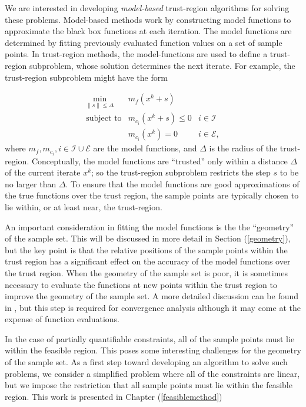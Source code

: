 \documentclass{article}
\newcommand{\norm}[1]{\| #1 \|}
\newcommand{\union}{\cup}
\let\oldref\ref
\renewcommand{\ref}[1]{(\oldref{#1})}
\begin{document}
We are interested in developing {\em model-based} trust-region algorithms for solving these problems.
Model-based methods work by constructing model functions to approximate the black box functions at each iteration.
The model functions are determined by fitting previously evaluated function values on a set of sample points.
In trust-region methods, the model-functions are used to define a trust-region subproblem, whose solution determines the next iterate.
For example, the trust-region subproblem might have the form

\[ \begin{array}{ccl} \min_{\norm{s} \le \Delta}
 & m_{f}(x^k+s) \\
\mbox{subject to} & m_{c_i}(x^k+s) \le 0 & i \in \mathcal{I} \\
& m_{c_i}(x^k) = 0 & i \in \mathcal{E},
\end{array}
\]
where $m_{f}, m_{c_i}, i \in \mathcal{I} \union \mathcal{E}$ are the model functions, and $\Delta$ is the radius of the trust-region.
Conceptually, the model functions are ``trusted'' only within a distance $\Delta$ of the current iterate $x^k$; so the trust-region subproblem restricts the step $s$ to be no larger than $\Delta$.
To ensure that the model functions are good approximations of the true functions over the trust region, the sample points are typically chosen to lie within, or at least near, the trust-region.


An important consideration in fitting the model functions is the the ``geometry'' of the sample set.
This will be discussed in more detail in Section \ref{geometry}, but the key point is that the relative positions of the sample points within the trust region has a significant effect on the accuracy of the model functions over the trust region.
When the geometry of the sample set is poor, it is sometimes necessary to evaluate the functions at new points within the trust region to improve the geometry of the sample set.
A more detailed discussion can be found in \cite{doi:10.1080/10556780802409296}, but this step is required for convergence analysis although it may come at the expense of function evaluations.

In the case of partially quantifiable constraints, all of the sample points must lie within the feasible region.  This poses some interesting challenges for the geometry of the sample set.  As a first step toward developing an algorithm to solve such problems, we consider a simplified problem where all of the constraints are linear, but we impose the restriction that all sample points must lie within the feasible region.  This work is presented in Chapter \ref{feasiblemethod}
\end{document}
